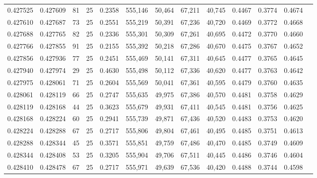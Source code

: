 \begin{tabular}{rrrrrrrrrrrrr}
0.427525 & 0.427609 &    81 &  25 &                                     0.2358 & 555,146 &  50,464 &  67,211 &  40,745 & 0.4467 & 0.3774 & 0.4674 \\
0.427610 & 0.427687 &    73 &  25 &                                     0.2551 & 555,219 &  50,391 &  67,236 &  40,720 & 0.4469 & 0.3772 & 0.4668 \\
0.427688 & 0.427765 &    82 &  25 &                                     0.2336 & 555,301 &  50,309 &  67,261 &  40,695 & 0.4472 & 0.3770 & 0.4660 \\
0.427766 & 0.427855 &    91 &  25 &                                     0.2155 & 555,392 &  50,218 &  67,286 &  40,670 & 0.4475 & 0.3767 & 0.4652 \\
0.427856 & 0.427936 &    77 &  25 &                                     0.2451 & 555,469 &  50,141 &  67,311 &  40,645 & 0.4477 & 0.3765 & 0.4645 \\
0.427940 & 0.427974 &    29 &  25 &                                     0.4630 & 555,498 &  50,112 &  67,336 &  40,620 & 0.4477 & 0.3763 & 0.4642 \\
0.427975 & 0.428061 &    71 &  25 &                                     0.2604 & 555,569 &  50,041 &  67,361 &  40,595 & 0.4479 & 0.3760 & 0.4635 \\
0.428061 & 0.428119 &    66 &  25 &                                     0.2747 & 555,635 &  49,975 &  67,386 &  40,570 & 0.4481 & 0.3758 & 0.4629 \\
0.428119 & 0.428168 &    44 &  25 &                                     0.3623 & 555,679 &  49,931 &  67,411 &  40,545 & 0.4481 & 0.3756 & 0.4625 \\
0.428168 & 0.428224 &    60 &  25 &                                     0.2941 & 555,739 &  49,871 &  67,436 &  40,520 & 0.4483 & 0.3753 & 0.4620 \\
0.428224 & 0.428288 &    67 &  25 &                                     0.2717 & 555,806 &  49,804 &  67,461 &  40,495 & 0.4485 & 0.3751 & 0.4613 \\
0.428288 & 0.428344 &    45 &  25 &                                     0.3571 & 555,851 &  49,759 &  67,486 &  40,470 & 0.4485 & 0.3749 & 0.4609 \\
0.428344 & 0.428408 &    53 &  25 &                                     0.3205 & 555,904 &  49,706 &  67,511 &  40,445 & 0.4486 & 0.3746 & 0.4604 \\
0.428410 & 0.428478 &    67 &  25 &                                     0.2717 & 555,971 &  49,639 &  67,536 &  40,420 & 0.4488 & 0.3744 & 0.4598 \\

\end{tabular}
